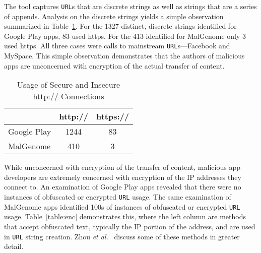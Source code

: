 The tool captures \texttt{URL}s that are discrete strings as well as strings that are a series of appends.  Analysis on the discrete strings yields a simple observation summarized in Table~\ref{table:sec}.  For the 1327 distinct, discrete strings identified for Google Play apps, 83 used https.  For the 413 identified for MalGenome only 3 used https.  All three cases were calls to mainstream \texttt{URL}s---Facebook and MySpace.  This simple observation demonstrates that the authors of malicious apps are unconcerned with encryption of the actual transfer of content. 

\begin{table}[t]
  \begin{center}
    {\small
\begin{tabular}{|l|c|c|}
\hline
          & http:// & https:// \\
\hline
Google Play & 1244    &	83 \\
MalGenome & 410     &	3 \\
\hline
\end{tabular}
}
\vspace{.1in}
    \caption{Usage of Secure and Insecure http:// Connections}
    \label{table:sec}
  \end{center}
\end{table}

While unconcerned with encryption of the transfer of content, malicious app
developers are extremely concerned with encryption of the IP addresses they
connect to.  An examination of Google Play apps revealed that there were no
instances of obfuscated or encrypted \texttt{URL} usage.  The same examination
of MalGenome apps identified 100s of instances of obfuscated or encrypted
\texttt{URL} usage.  Table~\ref{table:enc} demonstrates this, where the left
column are methods that accept obfuscated text, typically the IP portion of the
address, and are used in \texttt{URL} string creation. Zhou {\em et
al.}~\cite{TechnicalReport} discuss some of these methods in greater detail.

